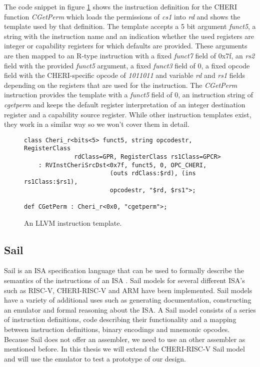 The code snippet in figure \ref{fig:insttemplate} shows the instruction definition for the CHERI function \textit{CGetPerm} which loads the permissions of \textit{cs1} into \textit{rd} and shows the template used by that definition.
The template accepts a 5 bit argument \textit{funct5}, a string with the instruction name and an indication whether the used registers are integer or capability registers for which defaults are provided.
These arguments are then mapped to an R-type instruction with a fixed \textit{funct7} field of 0x7f, an \textit{rs2} field with the provided \textit{funct5} argument, a fixed \textit{funct3} field of 0, a fixed opcode field with the CHERI-specific opcode of \textit{1011011} and variable \textit{rd} and \textit{rs1} fields depending on the registers that are used for the instruction.
The \textit{CGetPerm} instruction provides the template with a \textit{funct5} field of 0, an instruction string of \textit{cgetperm} and keeps the default register interpretation of an integer destination register and a capability source register.
While other instruction templates exist, they work in a similar way so we won't cover them in detail.

\begin{figure}[h]
\begin{verbatim}
class Cheri_r<bits<5> funct5, string opcodestr, RegisterClass
              rdClass=GPR, RegisterClass rs1Class=GPCR>
    : RVInstCheriSrcDst<0x7f, funct5, 0, OPC_CHERI,
                        (outs rdClass:$rd), (ins rs1Class:$rs1),
                        opcodestr, "$rd, $rs1">;

def CGetPerm : Cheri_r<0x0, "cgetperm">;
\end{verbatim}
\caption{An LLVM instruction template.}
\label{fig:insttemplate}
\end{figure}

\subsection{Sail}
Sail is an ISA specification language that can be used to formally describe the semantics of the instructions of an ISA \cite{10.1145/3290384}. Sail models for several different ISA's such as RISC-V, CHERI-RISC-V and ARM have been implemented. Sail models have a variety of additional uses such as generating documentation, constructing an emulator and formal reasoning about the ISA.
A Sail model consists of a series of instruction definitions, code describing their functionality and a mapping between instruction definitions, binary encodings and mnemonic opcodes.
Because Sail does not offer an assembler, we need to use an other assembler as mentioned before.
In this thesis we will extend the CHERI-RISC-V Sail model and will use the emulator to test a prototype of our design.


